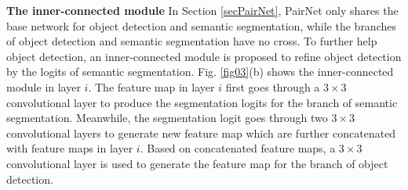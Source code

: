 \documentclass[10pt,twocolumn,letterpaper]{article}
\begin{document}
\textbf{The inner-connected module} In Section \ref{secPairNet}, PairNet only shares the base network for object detection and semantic segmentation, while the branches of object detection and semantic segmentation have no cross. To further help object detection, an inner-connected module is proposed to refine object detection by the logits of semantic segmentation.  Fig. \ref{fig03}(b) shows the inner-connected module in layer $i$. The feature map in layer $i$ first goes through a $3\times 3$ convolutional layer to produce the segmentation logits for the branch of semantic segmentation. Meanwhile, the segmentation logit goes through two $3\times 3$ convolutional layers to generate new feature map which are further concatenated with feature maps in layer $i$. Based on concatenated feature maps, a $3\times 3$ convolutional layer is used to generate the feature map for the branch of object detection. 
\end{document}
